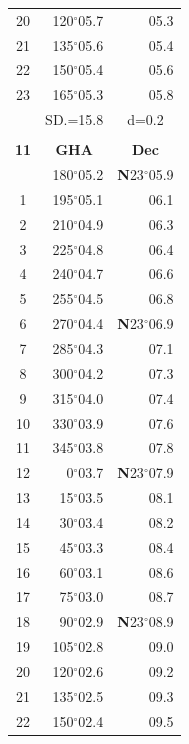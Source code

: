 \documentclass[10pt, a4paper]{report}
\begin{document}
\begin{scriptsize}
\begin{tabular*}{0.2\textwidth}[t]{@{\extracolsep{\fill}}|c|rr|}
20 & 120$^\circ$05.7 & 05.3\\
21 & 135$^\circ$05.6 & \raisebox{0.24ex}{\boldmath$\cdot$~\boldmath$\cdot$~~}05.4\\
22 & 150$^\circ$05.4 & 05.6\\
23 & 165$^\circ$05.3 & 05.8\\
\hline
\rule{0pt}{2.4ex} & \multicolumn{1}{c}{SD.=15.8} & \multicolumn{1}{c|}{d=0.2}\\
\hline
\multicolumn{1}{c}{}\\[-0.5ex]\hline
\multicolumn{1}{|c|}{\rule{0pt}{2.6ex}\textbf{11}} & \multicolumn{1}{c}{\textbf{GHA}} & \multicolumn{1}{c|}{\textbf{Dec}}\\
\hline\rule{0pt}{2.6ex}\noindent
0 & 180$^\circ$05.2 & \textbf{N}23$^\circ$05.9\\
1 & 195$^\circ$05.1 & 06.1\\
2 & 210$^\circ$04.9 & 06.3\\
3 & 225$^\circ$04.8 & \raisebox{0.24ex}{\boldmath$\cdot$~\boldmath$\cdot$~~}06.4\\
4 & 240$^\circ$04.7 & 06.6\\
5 & 255$^\circ$04.5 & 06.8\\[2Pt]
6 & 270$^\circ$04.4 & \textbf{N}23$^\circ$06.9\\
7 & 285$^\circ$04.3 & 07.1\\
8 & 300$^\circ$04.2 & 07.3\\
9 & 315$^\circ$04.0 & \raisebox{0.24ex}{\boldmath$\cdot$~\boldmath$\cdot$~~}07.4\\
10 & 330$^\circ$03.9 & 07.6\\
11 & 345$^\circ$03.8 & 07.8\\[2Pt]
12 & 0$^\circ$03.7 & \textbf{N}23$^\circ$07.9\\
13 & 15$^\circ$03.5 & 08.1\\
14 & 30$^\circ$03.4 & 08.2\\
15 & 45$^\circ$03.3 & \raisebox{0.24ex}{\boldmath$\cdot$~\boldmath$\cdot$~~}08.4\\
16 & 60$^\circ$03.1 & 08.6\\
17 & 75$^\circ$03.0 & 08.7\\[2Pt]
18 & 90$^\circ$02.9 & \textbf{N}23$^\circ$08.9\\
19 & 105$^\circ$02.8 & 09.0\\
20 & 120$^\circ$02.6 & 09.2\\
21 & 135$^\circ$02.5 & \raisebox{0.24ex}{\boldmath$\cdot$~\boldmath$\cdot$~~}09.3\\
22 & 150$^\circ$02.4 & 09.5\\

\end{tabular*}
\end{scriptsize}
\end{document}
